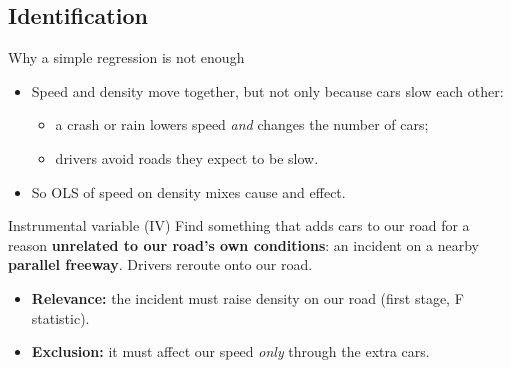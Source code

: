 \documentclass[compress]{beamer}
\newcommand{\hl}[1]{{\color{IITRBlue}\textbf{#1}}}
\begin{document}
\subsection{Identification}
\begin{frame}[t]{Why a simple regression is not enough}
\begin{itemize}
\item Speed and density move together, but not only because cars slow each other:
\begin{itemize}
\item a crash or rain lowers speed \emph{and} changes the number of cars;
\item drivers avoid roads they expect to be slow.
\end{itemize}
\item So OLS of speed on density mixes cause and effect.
\end{itemize}
\begin{block}{Instrumental variable (IV)}
Find something that adds cars to our road for a reason \hl{unrelated to our road's own conditions}: an incident on a nearby \hl{parallel freeway}. Drivers reroute onto our road.
\end{block}
\begin{itemize}
\item \textbf{Relevance:} the incident must raise density on our road (first stage, F statistic).
\item \textbf{Exclusion:} it must affect our speed \emph{only} through the extra cars.
\end{itemize}
\end{frame}
\end{document}
